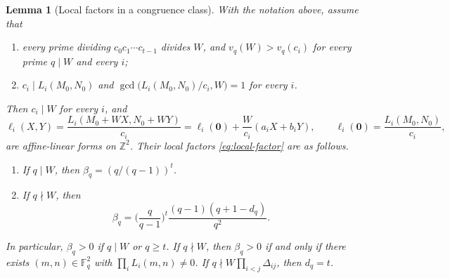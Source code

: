 \documentclass[12pt,oneside,openany]{book}
\theoremstyle{definition}
\theoremstyle{plain}
\numberwithin{equation}{chapter}
\theoremstyle{plain}
\newtheorem{lemma}[lemma]{Lemma}
\theoremstyle{definition}
\theoremstyle{remark}
\newcommand{\Z}{\mathbb Z}
\newcommand{\F}{\mathbb F}
\begin{document}
\begin{lemma}[Local factors in a congruence class]\label{lem:local-factors}
With the notation above, assume that
\begin{enumerate}[label=(\roman*)]
\item\label{item:lf-cofactors} every prime dividing $c_0c_1\cdots c_{t-1}$ divides $W$, and $v_q(W)>v_q(c_i)$ for every prime $q\mid W$ and every $i$;
\item\label{item:lf-anchor} $c_i\mid L_i(M_0,N_0)$ and $\gcd\big(L_i(M_0,N_0)/c_i,W\big)=1$ for every $i$.
\end{enumerate}
Then $c_i\mid W$ for every $i$, and
\begin{equation}\label{eq:affine-forms}
\ell_i(X,Y)=\frac{L_i(M_0+WX,N_0+WY)}{c_i}=\ell_i(\mathbf 0)+\frac W{c_i}(a_iX+b_iY),\qquad\ell_i(\mathbf 0)=\frac{L_i(M_0,N_0)}{c_i},
\end{equation}
are affine-linear forms on $\Z^2$. Their local factors \eqref{eq:local-factor} are as follows.
\begin{enumerate}[label=(\alph*)]
\item\label{item:lf-divides} If $q\mid W$, then $\beta_q=(q/(q-1))^t$.
\item\label{item:lf-coprime} If $q\nmid W$, then
\begin{equation}\label{eq:local-factor-formula}
\beta_q=\Big(\frac q{q-1}\Big)^t\frac{(q-1)(q+1-d_q)}{q^2}.
\end{equation}
\end{enumerate}
In particular, $\beta_q>0$ if $q\mid W$ or $q\ge t$. If $q\nmid W$, then $\beta_q>0$ if and only if there exists $(m,n)\in\F_q^2$ with $\prod_iL_i(m,n)\ne0$. If $q\nmid W\prod_{i<j}\Delta_{ij}$, then $d_q=t$.
\end{lemma}
\end{document}

